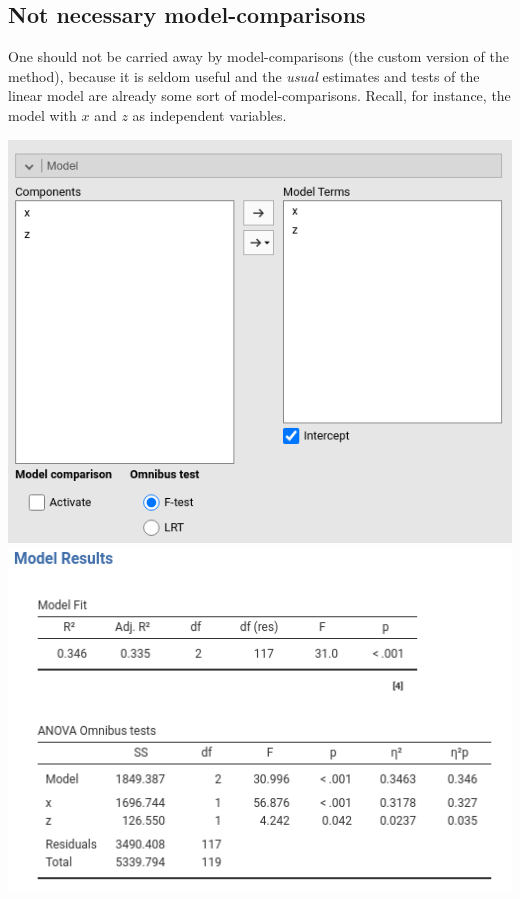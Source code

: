 \documentclass[
]{book}
\begin{document}
\hypertarget{not-necessary-model-comparisons}{%
\subsection{Not necessary model-comparisons}\label{not-necessary-model-comparisons}}

One should not be carried away by model-comparisons (the custom version of the method), because it is seldom useful and the \emph{usual} estimates and tests of the linear model are already some sort of model-comparisons. Recall, for instance, the model with \(x\) and \(z\) as independent variables.

\includegraphics{bookletpics/2_modelcomparison_input4.png}
\includegraphics{bookletpics/2_modelcomparison_output4.png}
\end{document}

